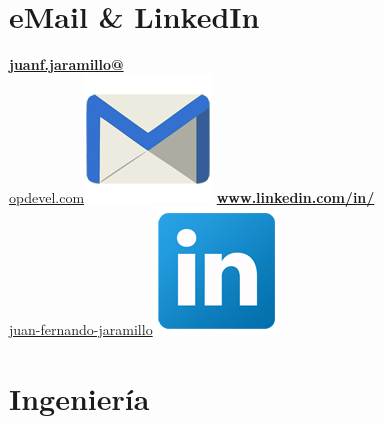 \begin{aside}
    \section{eMail \& LinkedIn}
    \href{mailto:juanf.jaramillo@opdevel.com}{\small{\textbf{juanf.jaramillo@}\\opdevel.com}\includegraphics[scale=0.07]{img/email2.png}}
    \href{https://www.linkedin.com/in/juan-fernando-jaramillo/}{\textbf{www.linkedin.com/in/}\small{\\juan-fernando-jaramillo}\includegraphics[scale=0.07]{img/Linkedin.png}}
   ~
   ~
   ~
   ~
   ~
  \section{Ingeniería}
\end{aside}
